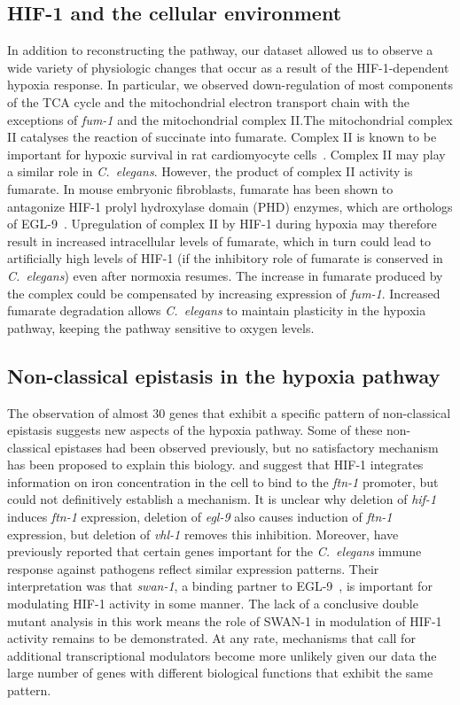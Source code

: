 \documentclass[9pt,twocolumn,twoside]{pnas-new}
\newcommand{\cel}{\emph{C.~elegans}}
\newcommand{\gene}[1]{\emph{#1}}
\newcommand{\ftna}{\emph{ftn-1}}
\newcommand{\eglp}{EGL-9}
\newcommand{\hifp}{HIF-1}
\begin{document}
\subsection*{\hifp{} and the cellular environment}

In addition to reconstructing the pathway, our dataset allowed us
to observe a wide variety of physiologic changes that occur as a result of the
\hifp{}-dependent hypoxia response. In particular, we observed down-regulation of most
components of the TCA cycle and the mitochondrial electron transport chain with
the exceptions of \gene{fum-1} and the mitochondrial complex II.\@ The mitochondrial
complex II catalyses the reaction of succinate into fumarate. Complex II is known
to be important for hypoxic survival in rat cardiomyocyte cells~\cite{Pfleger2015}.
Complex II may play a similar role in \cel{}. However, the product of complex II
activity is fumarate. In mouse embryonic fibroblasts, fumarate has been
shown to antagonize \hifp{} prolyl hydroxylase domain (PHD) enzymes, which are
orthologs of \eglp{}~\cite{Sudarshan2009}. Upregulation of complex II by \hifp{}
during hypoxia may therefore result in increased intracellular levels of fumarate,
which in turn could lead to artificially high levels of \hifp{} (if the inhibitory
role of fumarate is conserved in \cel{}) even after normoxia resumes. The increase
in fumarate produced by the complex could be compensated by increasing expression of
\gene{fum-1}. Increased fumarate degradation allows \cel{} to maintain plasticity
in the hypoxia pathway, keeping the pathway sensitive to oxygen levels.

\subsection*{Non-classical epistasis in the hypoxia pathway}
The observation of almost 30 genes that exhibit a specific pattern of non-classical
epistasis suggests new aspects of the hypoxia pathway. Some of these non-classical
epistases had been observed previously, but no satisfactory mechanism has been
proposed to explain this biology. \citep{Romney2011} and \citep{Ackerman2012}
suggest that \hifp{} integrates information on iron concentration in the
cell to bind to the \ftna{} promoter, but could not definitively establish
a mechanism.
It is unclear why deletion of \gene{hif-1} induces \ftna{}
expression, deletion of \gene{egl-9} also causes induction of \ftna{} expression,
but deletion of \gene{vhl-1} removes this inhibition. Moreover, \citep{Luhachack2012}
have previously reported that certain genes important for the \cel{} immune response
against pathogens reflect similar expression patterns. Their interpretation
was that \gene{swan-1}, a binding partner to \eglp{}~\cite{Shao2010}, is important
for modulating \hifp{} activity in some manner. The lack of a conclusive double
mutant analysis in this work means the role of SWAN-1 in modulation of
\hifp{} activity remains to be demonstrated.
At any rate, mechanisms that call for additional
transcriptional modulators become more unlikely given our data the large number of
genes with different biological functions that exhibit the same pattern.
\end{document}
